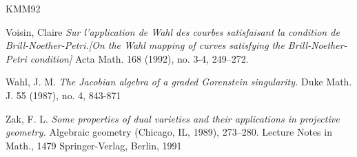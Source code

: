 \documentclass[11pt,twoside]{amsart}
\theoremstyle{plain}
\numberwithin{equation}{section}
\theoremstyle{definition}
\begin{document}
\begin{thebibliography}{KMM92}



Voisin, Claire
\emph{Sur l'application de Wahl des courbes satisfaisant la condition de Brill-Noether-Petri.[On the Wahl mapping of curves satisfying the Brill-Noether-Petri condition]}
Acta Math. 168 (1992), no. 3-4, 249–272.






Wahl, J. M. 
\emph{The Jacobian algebra of a graded Gorenstein singularity.}
Duke Math. J. 55 (1987), no. 4,
843-871

Zak, F. L.
\emph{Some properties of dual varieties and their applications in projective geometry.}
Algebraic geometry (Chicago, IL, 1989), 273–280.
Lecture Notes in Math., 1479
Springer-Verlag, Berlin, 1991

 






  

\end{thebibliography}
\end{document}
